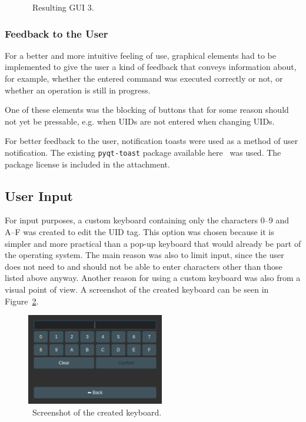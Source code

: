 \begin{figure}[h]
\begin{minipage}[b]{0.315\textwidth}
        \caption{~Resulting GUI 3.}
        \label{fig:ui3}
    \end{minipage}
\end{figure}


\subsubsection{Feedback to the User}
For a better and more intuitive feeling of use, graphical elements had to be implemented to give the user a kind of feedback that conveys information about, for example, whether the entered command was executed correctly or not, or whether an operation is still in progress.

One of these elements was the blocking of buttons that for some reason should not yet be pressable, e.g. when UIDs are not entered when changing UIDs.

For better feedback to the user, notification toasts were used as a method of user notification. The existing \texttt{pyqt-toast} package available here~\cite{toast} was used. The package license is included in the attachment.


\subsection{User Input}

For input purposes, a custom keyboard containing only the characters 0--9 and A--F was created to edit the UID tag. This option was chosen because it is simpler and more practical than a pop-up keyboard that would already be part of the operating system. The main reason was also to limit input, since the user does not need to and should not be able to enter characters other than those listed above anyway. Another reason for using a custom keyboard was also from a visual point of view. A screenshot of the created keyboard can be seen in Figure~\ref{fig:keyboard}.

\begin{figure}[ht]
  \centering
  \includegraphics[width=6cm]{text/implementation/keyboard.png}
  \caption{~Screenshot of the created keyboard.}
  \label{fig:keyboard}
\end{figure}



